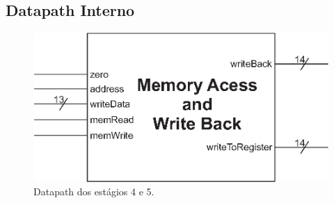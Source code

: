 \subsection{Datapath Interno}
	
	\begin{figure}[ht]
		\begin{center}
		\includegraphics{./datapath/Graphic4.eps}
		\caption*{Datapath dos estágios 4 e 5.}
		\end{center}
	\end{figure}